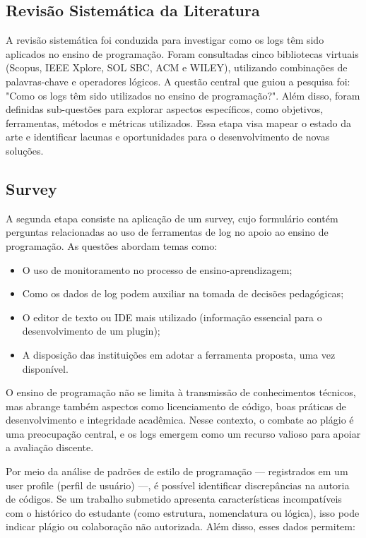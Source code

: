\documentclass[12pt,a4paper]{article}
\begin{document}
	\subsection{Revisão Sistemática da Literatura}
	A revisão sistemática foi conduzida para investigar como os logs têm sido aplicados no ensino de programação. Foram consultadas cinco bibliotecas virtuais (Scopus, IEEE Xplore, SOL SBC, ACM e WILEY), utilizando combinações de palavras-chave e operadores lógicos. A questão central que guiou a pesquisa foi: "Como os logs têm sido utilizados no ensino de programação?". Além disso, foram definidas sub-questões para explorar aspectos específicos, como objetivos, ferramentas, métodos e métricas utilizados. Essa etapa visa mapear o estado da arte e identificar lacunas e oportunidades para o desenvolvimento de novas soluções.
	
	\subsection{Survey}
	A segunda etapa consiste na aplicação de um survey, cujo formulário contém perguntas relacionadas ao uso de ferramentas de log no apoio ao ensino de programação. As questões abordam temas como:
	
\begin{itemize}
	\item O uso de monitoramento no processo de ensino-aprendizagem;
	\item Como os dados de log podem auxiliar na tomada de decisões pedagógicas;
	\item O editor de texto ou IDE mais utilizado (informação essencial para o desenvolvimento de um plugin);
	\item A disposição das instituições em adotar a ferramenta proposta, uma vez disponível.
\end{itemize}
	O ensino de programação não se limita à transmissão de conhecimentos técnicos, mas abrange também aspectos como licenciamento de código, boas práticas de desenvolvimento e integridade acadêmica. Nesse contexto, o combate ao plágio é uma preocupação central, e os logs emergem como um recurso valioso para apoiar a avaliação discente.

	Por meio da análise de padrões de estilo de programação — registrados em um user profile (perfil de usuário) —, é possível identificar discrepâncias na autoria de códigos. Se um trabalho submetido apresenta características incompatíveis com o histórico do estudante (como estrutura, nomenclatura ou lógica), isso pode indicar plágio ou colaboração não autorizada. Além disso, esses dados permitem:
	
\end{document}
